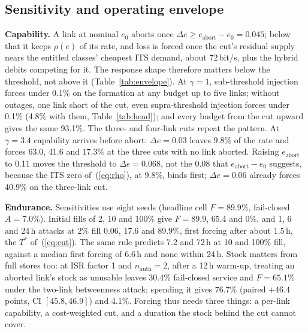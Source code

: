 \documentclass[conference,a4paper]{IEEEtran}
\begin{document}
\subsection{Sensitivity and operating envelope}\label{sec:sens}
\begin{table}[t]
\caption{Capability against budget: forced assurance loss $F$ (\%) after a 24\,h
attack from 2\% usable fill, outage-free, eight seeds; $\pm$ is the larger side of
the 95\% bootstrap interval. Complete suppression starts at $\Delta e=0.045$.}
\label{tab:envelope}
\centering\scriptsize
\setlength{\tabcolsep}{1.6pt}

\end{table}

\textbf{Capability.} A link at nominal $e_0$ aborts once $\Delta e\ge
e_{\mathrm{abort}}-e_0=0.045$; below that it keeps
$\rho(e)$ of its rate, and loss is forced once the cut's residual supply nears the entitled classes' cheapest ITS demand, about 72\,bit/s, plus the hybrid debits competing for it. The response shape
therefore matters below the threshold, not above it (Table~\ref{tab:envelope}). At
$\gamma=1$, sub-threshold injection forces under 0.1\% on the formation at any budget
up to five links; without outages, one link short of the cut, even supra-threshold injection forces under 0.1\% (4.8\% with them, Table~\ref{tab:head}); and every budget from the cut upward gives the same 93.1\%. The three-
and four-link cuts repeat the pattern. At $\gamma=3.4$
capability arrives before abort: $\Delta e=0.03$ leaves 9.8\% of the rate and forces
63.0, 41.6 and 17.3\% at the three cuts with no link aborted. Raising
$e_{\mathrm{abort}}$ to 0.11 moves the threshold to $\Delta e=0.068$, not the 0.08 that $e_{\mathrm{abort}}-e_0$ suggests, because the ITS zero of~(\ref{eq:rho}), at 9.8\%, binds
first; $\Delta e=0.06$ already forces 40.9\% on the three-link cut.

\textbf{Endurance.} Sensitivities use eight seeds (headline cell $F=89.9\%$, fail-closed $A=7.0\%$). Initial fills of 2, 10 and 100\% give $F=89.9$, 65.4 and 0\%, and 1, 6 and 24\,h attacks at 2\% fill 0.06, 17.6 and 89.9\%, first forcing after about 1.5\,h, the $T^\ast$ of~(\ref{eq:cut}). The same rule predicts 7.2 and 72\,h at 10 and 100\% fill, against a median first forcing of 6.6\,h and none within 24\,h. Stock matters from full stores too: at ISR factor 1 and $n_{\mathrm{auth}}=2$, after a 12\,h warm-up, treating an aborted link's stock as unusable leaves 30.4\% fail-closed service and $F=65.1\%$ under the two-link betweenness attack; spending it gives 76.7\% (paired $+46.4$ points, CI $[45.8,46.9]$) and 4.1\%. Forcing thus needs three things: a per-link capability, a
cost-weighted cut, and a duration the stock behind the cut cannot cover.
\end{document}
